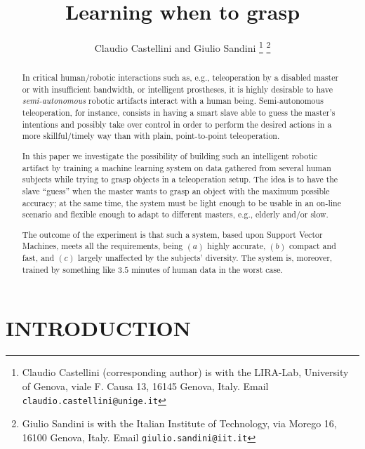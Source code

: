 \documentclass[a4paper,10pt,conference]{ieeeconf}
\title{\LARGE \bf Learning when to grasp}
\author{Claudio Castellini and Giulio Sandini%
\thanks{Claudio Castellini (corresponding author) is
with the LIRA-Lab, University of Genova,
viale F. Causa 13, 16145 Genova, Italy. Email
{\tt\small claudio.castellini@unige.it}}%
\thanks{Giulio Sandini is with the Italian Institute of Technology,
via Morego 16, 16100 Genova, Italy. Email
{\tt\small giulio.sandini@iit.it}}%
}
\begin{document}
\maketitle
\thispagestyle{empty}
\pagestyle{empty}

\begin{abstract}

In critical human/robotic interactions such as, e.g., teleoperation by
a disabled master or with insufficient bandwidth, or intelligent
prostheses, it is highly desirable to have \emph{semi-autonomous}
robotic artifacts interact with a human being. Semi-autonomous
teleoperation, for instance, consists in having a smart slave able to
guess the master's intentions and possibly take over control in order
to perform the desired actions in a more skillful/timely way than with
plain, point-to-point teleoperation.

In this paper we investigate the possibility of building such an
intelligent robotic artifact by training a machine learning system on
data gathered from several human subjects while trying to grasp objects
in a teleoperation setup. The idea is to have the slave ``guess'' when
the master wants to grasp an object with the maximum possible
accuracy; at the same time, the system must be light enough to be
usable in an on-line scenario and flexible enough to adapt to
different masters, e.g., elderly and/or slow.

The outcome of the experiment is that such a system, based upon
Support Vector Machines, meets all the requirements, being $(a)$
highly accurate, $(b)$ compact and fast, and $(c)$ largely unaffected
by the subjects' diversity. The system is, moreover, trained by
something like $3.5$ minutes of human data in the worst case.

\end{abstract}

\section{INTRODUCTION}
\end{document}
